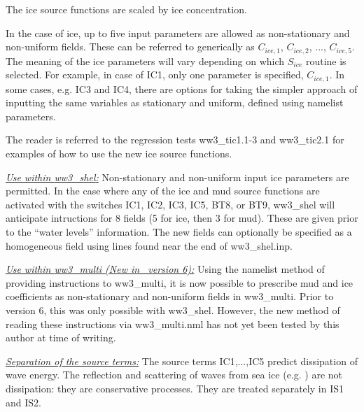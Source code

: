 The ice source functions are scaled by ice concentration.

In the case of ice, up to five input parameters are allowed as 
non-stationary and non-uniform fields. These can be referred
to generically as ${C_{ice,1}}$, ${C_{ice,2}}$, ..., ${C_{ice,5}}$.  The meaning
of the ice parameters will vary depending on which ${S_{ice}}$ routine is
selected. For example, in case of {\code IC1}, only one parameter is specified, ${C_{ice,1}}$.
In some cases, e.g. {\code IC3} and {\code IC4}, there are options for taking the simpler approach
of inputting the same variables as stationary and uniform, defined using namelist parameters.

The reader is referred to the regression tests {\file ww3\_tic1.1-3} and
{\file ww3\_tic2.1} for examples of how to use the new ice source functions.

\textrm{\textit{\underline{Use within {\file ww3\_shel}:}}} 
Non-stationary and non-uniform input ice parameters are permitted.
In the case where any of the ice and mud source functions are activated with
the switches {\code IC1}, {\code IC2}, {\code IC3}, {\code IC5}, {\code BT8}, or {\code
BT9}, {\file ww3\_shel} will anticipate intructions for 8 fields (5 for ice,
then 3 for mud). These are given prior to the ``water levels'' information.
The new fields can optionally be specified as a homogeneous field using lines
found near the end of {\file ww3\_shel.inp}. 

\textrm{\textit{\underline{Use within {\file ww3\_multi} (New in \ws\ version 6):}}} Using the namelist method of
providing instructions to {\file ww3\_multi}, it is now possible to prescribe mud and ice coefficients as non-stationary and non-uniform fields in {\file ww3\_multi}. Prior to version 6, this was only possible with {\file ww3\_shel}. 
However, the new method of reading these instructions via {\file ww3\_multi.nml} has not yet been tested by this author at time of writing.

\textrm{\textit{\underline{Separation of the source terms:}}} 
The source terms {\code IC1},...,{\code IC5} predict dissipation of wave energy. The reflection and scattering of waves from sea ice  (e.g. \cite{art:Wad75}) are not dissipation: they are conservative processes. They are treated separately in {\code IS1} and {\code IS2}.
